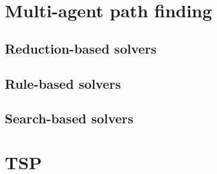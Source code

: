 \section{Multi-agent path finding}

\subsection{Reduction-based solvers}



\subsection{Rule-based solvers}



\subsection{Search-based solvers}




\section{TSP}
